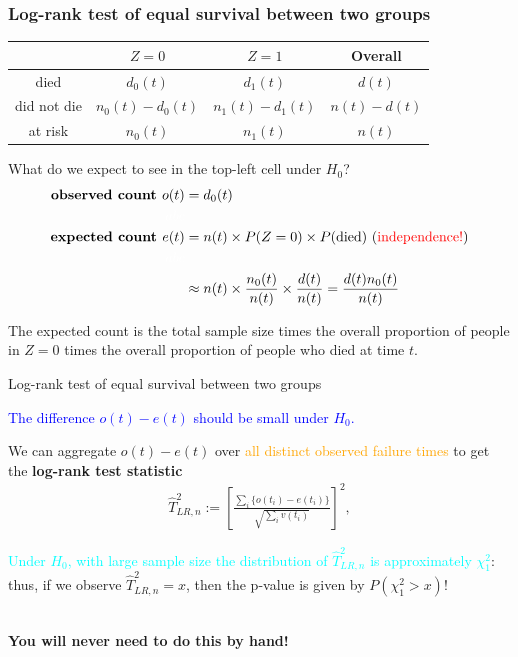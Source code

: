 \documentclass[10pt,t]{beamer}
\begin{document}
\begin{frame}
\frametitle{Log-rank test of equal survival between two groups}

\vspace{-7 mm}

\begin{center}
\begin{tabular}{c|c|c|c}
& $Z = 0$ & $Z = 1$ & Overall\\
\hline
died & $d_0(t)$ & $d_1(t)$ & $d(t)$ \\
did not die & $n_0(t) - d_0(t)$ & $n_1(t) - d_1(t)$ & $n(t) - d(t)$\\
at risk & $n_0(t)$ & $n_1(t)$ & $n(t)$
\end{tabular}
\end{center}

\medskip

What do we expect to see in the top-left cell under $H_0$?
\begin{align*}
\textbf{observed count } o(t) &= d_0(t) \\
\textcolor{white}{abc}\\
\textbf{expected count } e(t) &= n(t) \times P(Z = 0) \times P(\text{died}) \text{  (\textcolor{red}{independence!})}\\
\textcolor{white}{abc}\\
&\approx n(t)\times \frac{n_0(t)}{n(t)}\times  \frac{d(t)}{n(t)} = \frac{d(t)n_0(t)}{n(t)}
\end{align*}

\medskip

The expected count is the total sample size times the overall proportion of people in $Z=0$ times the overall proportion of people who died at time $t$.

\end{frame}

\begin{frame}{Log-rank test of equal survival between two groups }


\textcolor{blue}{The difference $o(t) - e(t)$ should be small under $H_0$.} 

\medskip

We can aggregate $o(t) - e(t)$ over \textcolor{orange}{all distinct observed failure times} to get the \textbf{log-rank test statistic}
\begin{align*}
\widehat{T}^2_{LR, n} := \left[\frac{\sum_i \{o(t_i) - e(t_i)\}}{\sqrt{\sum_iv(t_i)}} \right]^2,
\end{align*}

\textcolor{cyan}{Under $H_0$, with large sample size the distribution of $\widehat{T}^2_{LR, n}$ is approximately $\chi^2_1$}: thus, if we observe $\widehat{T}^2_{LR, n} = x$, then the p-value is given by $P(\chi^2_1 > x)$!
\\ ~\ 

\textbf{You will never need to do this by hand!}
\end{frame}
\end{document}
